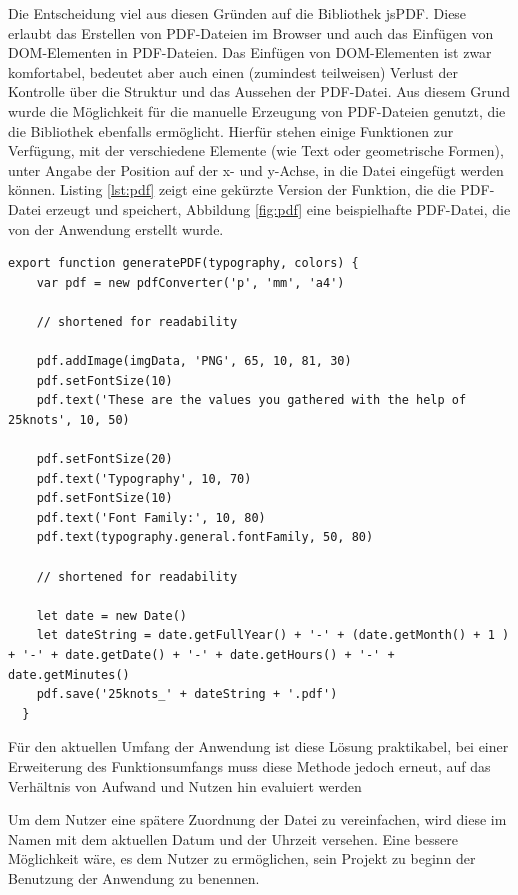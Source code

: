 
Die Entscheidung viel aus diesen Gründen auf die Bibliothek jsPDF\footnotemark{}. Diese erlaubt das Erstellen von PDF-Dateien im Browser und auch das Einfügen von DOM-Elementen in PDF-Dateien.
Das Einfügen von DOM-Elementen ist zwar komfortabel, bedeutet aber auch einen (zumindest teilweisen) Verlust der Kontrolle über die Struktur und das Aussehen der PDF-Datei.
Aus diesem Grund wurde die Möglichkeit für die manuelle Erzeugung von PDF-Dateien genutzt, die die Bibliothek ebenfalls ermöglicht. Hierfür stehen einige Funktionen zur Verfügung, mit der verschiedene Elemente (wie Text oder geometrische Formen), unter Angabe der Position auf der x- und y-Achse, in die Datei eingefügt werden können. Listing \ref{lst:pdf} zeigt eine gekürzte Version der Funktion, die die PDF-Datei erzeugt und speichert, Abbildung \ref{fig:pdf} eine beispielhafte PDF-Datei, die von der Anwendung erstellt wurde.

\begin{lstlisting}[caption={Beispilehafte Generierung einer PDF-Datei}, label=lst:pdf]
  export function generatePDF(typography, colors) {
    var pdf = new pdfConverter('p', 'mm', 'a4')

    // shortened for readability

    pdf.addImage(imgData, 'PNG', 65, 10, 81, 30)
    pdf.setFontSize(10)
    pdf.text('These are the values you gathered with the help of 25knots', 10, 50)

    pdf.setFontSize(20)
    pdf.text('Typography', 10, 70)
    pdf.setFontSize(10)
    pdf.text('Font Family:', 10, 80)
    pdf.text(typography.general.fontFamily, 50, 80)

    // shortened for readability

    let date = new Date()
    let dateString = date.getFullYear() + '-' + (date.getMonth() + 1 ) + '-' + date.getDate() + '-' + date.getHours() + '-' + date.getMinutes()
    pdf.save('25knots_' + dateString + '.pdf')
  }
\end{lstlisting}


Für den aktuellen Umfang der Anwendung ist diese Lösung praktikabel, bei einer Erweiterung des Funktionsumfangs muss diese Methode jedoch erneut, auf das Verhältnis von Aufwand und Nutzen hin evaluiert werden

Um dem Nutzer eine spätere Zuordnung der Datei zu vereinfachen, wird diese im Namen mit dem aktuellen Datum und der Uhrzeit versehen. Eine bessere Möglichkeit wäre, es dem Nutzer zu ermöglichen, sein Projekt zu beginn der Benutzung der Anwendung zu benennen.

